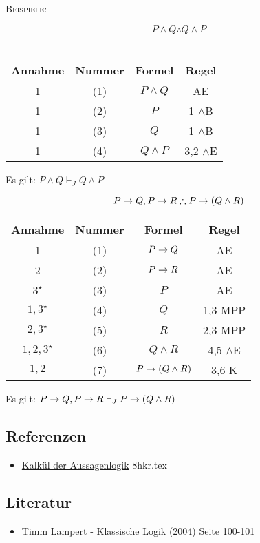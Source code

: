 \documentclass{sajzk}
\begin{document}
\textsc{Beispiele:}
\begin{center}
    \[P \land Q \therefore Q \land P\] \\
\begin{tabular}{|c|c|c|c|}
  \hline
  Annahme            & Nummer & Formel       & Regel \\
  \hline
  1                  & (1)    & $P \land Q$  & AE \\
  \hline
  1                  & (2)    & $P$          & 1 $\land$B \\
  \hline
  1                  & (3)    & $Q$          & 1 $\land$B \\
  \hline
  1                  & (4)    & $Q \land P$  & 3,2 $\land$E \\
  \hline
\end{tabular}
\end{center}
Es gilt: $P \land Q \vdash_J Q \land P$
\newpage
\begin{center}
    \[P \rightarrow Q, P \rightarrow R \therefore P \rightarrow (Q\land R)\]
\begin{tabular}{|c|c|c|c|}
  \hline
  Annahme            & Nummer & Formel                 & Regel \\
  \hline
  1                  & (1)    & $P \rightarrow Q$              & AE \\
  \hline
  2                  & (2)    & $P \rightarrow R$              & AE \\
  \hline
  $3^\star$          & (3)    & $P$                    & AE \\
  \hline
  $1, 3^\star$       & (4)    & $Q$                    & 1,3 MPP \\
  \hline
  $2, 3^\star$       & (5)    & $R$                    & 2,3 MPP \\
  \hline
  $1, 2, 3^\star$    & (6)    & $Q \land R$            & 4,5 $\land$E \\
  \hline
  $1, 2$             & (7)    & $P \rightarrow (Q \land R)$    & 3,6 K \\
  \hline
\end{tabular}
\end{center}
Es gilt: $P \rightarrow Q, P \rightarrow R \vdash_J P \rightarrow (Q\land R)$
\subsection{Referenzen}
\begin{itemize}
    \item \href{8hkr.pdf}{Kalkül der Aussagenlogik} 8hkr.tex
\end{itemize}

\subsection{Literatur}
\begin{itemize}
    \item Timm Lampert - Klassische Logik (2004) Seite 100-101
\end{itemize}
\end{document}
